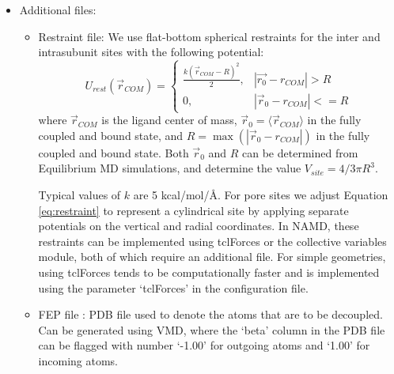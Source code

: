 \documentclass[12pt]{article}
\begin{document}
\begin{itemize}
\begin{itemize}
	\end{itemize}
\item Additional files:
	\begin{itemize} 
	\item Restraint file: 
	We use flat-bottom spherical restraints for the inter and intrasubunit sites with the following potential: 
	\begin{equation}
U_{rest}(\vec{r}_{COM}) = 	
\begin{cases} 
\frac{k (\vec{r}_{COM} - R)^2}{2} ,& \left |{\vec{r_{0}}}-r_{COM}\right |> R\\
0 ,&\left |{\vec{r}_{0}}-r_{COM}\right| <= R
\end{cases}\label{eq:restraint}
	\end{equation}
 where $\vec{r}_{COM}$ is the ligand center of mass, $\vec{r}_{0} = \langle \vec{r}_{COM} \rangle $ in the fully coupled and bound state, and $R = \max(\left|\vec{r}_{0}-r_{COM}\right |)$ in the fully coupled and bound state. Both $\vec{r}_{0}$  and $R$ can be determined from Equilibrium MD simulations, and determine the value $V_{site} = 4/3 \pi R^{3}$. 
 
Typical values of $k$ are 5 kcal/mol/\AA.  For pore sites we adjust Equation \ref{eq:restraint} to represent a cylindrical site by applying separate potentials on the vertical and radial coordinates.   In NAMD, these restraints can be implemented using tclForces or the collective variables module, both of which require an additional file.  For simple geometries, using tclForces tends to be computationally faster and is implemented using the parameter `tclForces' in the configuration file.

	\item FEP file : PDB file used to denote the atoms that are to be decoupled. Can be generated using VMD, where the `beta' column in the PDB file can be flagged with number `-1.00' for outgoing atoms and `1.00' for incoming atoms. 
	\end{itemize}
\end{itemize}
\end{document}
